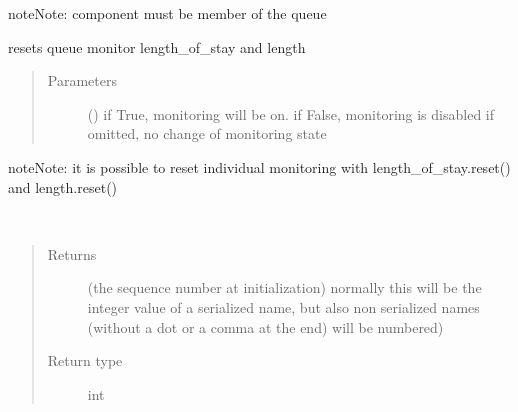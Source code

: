 \documentclass[letterpaper,10pt,english]{sphinxmanual}
\begin{document}
\begin{fulllineitems}
\begin{fulllineitems}
\begin{sphinxadmonition}{note}{Note:}
component must be member of the queue
\end{sphinxadmonition}

\end{fulllineitems}


\begin{fulllineitems}
\label{\detokenize{Reference:salabim.Queue.reset_monitors}}
resets queue monitor length\_of\_stay and length
\begin{quote}\begin{description}
\item[{Parameters}] \leavevmode
{} () \textendash{} if True, monitoring will be on. 
if False, monitoring is disabled 
if omitted, no change of monitoring state

\end{description}\end{quote}

\begin{sphinxadmonition}{note}{Note:}
it is possible to reset individual monitoring with length\_of\_stay.reset() and length.reset()
\end{sphinxadmonition}

\end{fulllineitems}


\begin{fulllineitems}
\label{\detokenize{Reference:salabim.Queue.sequence_number}}~\begin{quote}\begin{description}
\item[{Returns}] \leavevmode
{} \textendash{} (the sequence number at initialization) 
normally this will be the integer value of a serialized name,
but also non serialized names (without a dot or a comma at the end)
will be numbered)

\item[{Return type}] \leavevmode
int

\end{description}\end{quote}


\end{fulllineitems}
\end{fulllineitems}
\end{document}
